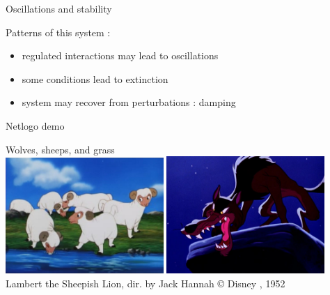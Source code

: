 \documentclass[11,aspectratio=1610]{beamer}
\begin{document}
\begin{frame}{Oscillations and stability}


\alert{Patterns} of this system  : 

\begin{itemize}
  \item regulated interactions may lead to \alert{oscillations}
  \item some conditions lead to \alert{extinction}
  \item system may recover from perturbations :  \alert{damping}
\end{itemize}

  
\end{frame}





\begin{frame}{Netlogo demo}

Wolves, sheeps, and grass\\
\vfill
\centering
\includegraphics[width=0.45\textwidth]{img/sheep.jpg}
\includegraphics[width=0.45\textwidth]{img/wolf.jpg}\\
\tiny{Lambert the Sheepish Lion, dir. by Jack Hannah © Disney , 1952}
\end{frame}
\end{document}
